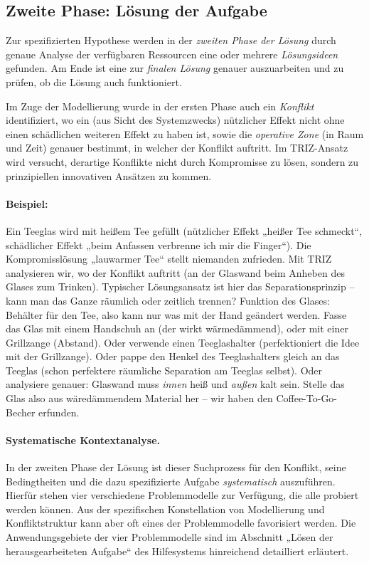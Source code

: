 \documentclass[11pt,a4paper]{article}
\begin{document}
\subsection{Zweite Phase: Lösung der Aufgabe}

Zur spezifizierten Hypothese werden in der \emph{zweiten Phase der Lösung}
durch genaue Analyse der verfügbaren Ressourcen eine oder mehrere
\emph{Lösungsideen} gefunden. Am Ende ist eine zur \emph{finalen Lösung}
genauer auszuarbeiten und zu prüfen, ob die Lösung auch funktioniert.

Im Zuge der Modellierung wurde in der ersten Phase auch ein \emph{Konflikt}
identifiziert, wo ein (aus Sicht des Systemzwecks) nützlicher Effekt nicht
ohne einen schädlichen weiteren Effekt zu haben ist, sowie die \emph{operative
  Zone} (in Raum und Zeit) genauer bestimmt, in welcher der Konflikt auftritt.
Im TRIZ-Ansatz wird versucht, derartige Konflikte nicht durch Kompromisse zu
lösen, sondern zu prinzipiellen innovativen Ansätzen zu kommen.

\paragraph{Beispiel:}
Ein Teeglas wird mit heißem Tee gefüllt (nützlicher Effekt „heißer Tee
schmeckt“, schädlicher Effekt „beim Anfassen verbrenne ich mir die Finger“).
Die Kompromisslösung „lauwarmer Tee“ stellt niemanden zufrieden.  Mit TRIZ
analysieren wir, wo der Konflikt auftritt (an der Glaswand beim Anheben des
Glases zum Trinken). Typischer Lösungsansatz ist hier das Separationsprinzip
-- kann man das Ganze räumlich oder zeitlich trennen?  Funktion des Glases:
Behälter für den Tee, also kann nur was mit der Hand geändert werden. Fasse
das Glas mit einem Handschuh an (der wirkt wärmedämmend), oder mit einer
Grillzange (Abstand). Oder verwende einen Teeglashalter (perfektioniert die
Idee mit der Grillzange).  Oder pappe den Henkel des Teeglashalters gleich an
das Teeglas (schon perfektere räumliche Separation am Teeglas selbst).  Oder
analysiere genauer: Glaswand muss \emph{innen} heiß und \emph{außen} kalt
sein.  Stelle das Glas also aus wäredämmendem Material her -- wir haben den
Coffee-To-Go-Becher erfunden.

\paragraph{Systematische Kontextanalyse.}
In der zweiten Phase der Lösung ist dieser Suchprozess für den Konflikt, seine
Bedingtheiten und die dazu spezifizierte Aufgabe \emph{systematisch}
auszuführen.  Hierfür stehen vier verschiedene Problemmodelle zur Verfügung,
die alle probiert werden können. Aus der spezifischen Konstellation von
Modellierung und Konfliktstruktur kann aber oft eines der Problemmodelle
favorisiert werden.  Die Anwendungsgebiete der vier Problemmodelle sind im
Abschnitt „Lösen der herausgearbeiteten Aufgabe“ des Hilfesystems hinreichend
detailliert erläutert.
\end{document}
